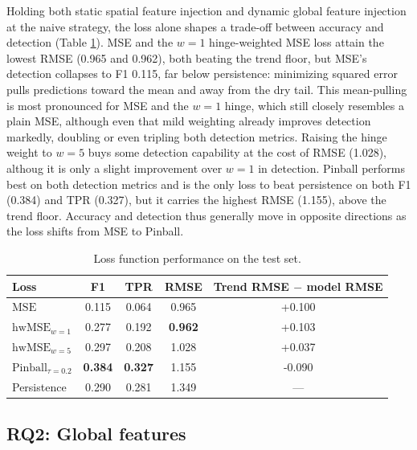 \documentclass[
]{krantz}
\begin{document}
Holding both static spatial feature injection and dynamic global feature injection at the naive strategy, the loss alone shapes a trade-off between accuracy and detection (Table \ref{tab:dp-loss-results}).
MSE and the \(w=1\) hinge-weighted MSE loss attain the lowest RMSE (0.965 and 0.962), both beating the trend floor, but MSE's detection collapses to F1 0.115, far below persistence: minimizing squared error pulls predictions toward the mean and away from the dry tail.
This mean-pulling is most pronounced for MSE and the \(w=1\) hinge, which still closely resembles a plain MSE, although even that mild weighting already improves detection markedly, doubling or even tripling both detection metrics.
Raising the hinge weight to \(w=5\) buys some detection capability at the cost of RMSE (1.028), althoug it is only a slight improvement over \(w=1\) in detection.
Pinball performs best on both detection metrics and is the only loss to beat persistence on both F1 (0.384) and TPR (0.327), but it carries the highest RMSE (1.155), above the trend floor.
Accuracy and detection thus generally move in opposite directions as the loss shifts from MSE to Pinball.

\begin{table}[!h]
\centering
\caption{\label{tab:dp-loss-results}Loss function performance on the test set.}
\centering
\fontsize{9}{11}\selectfont
\begin{tabular}[t]{lcccc}
\toprule
Loss & F1 & TPR & RMSE & Trend RMSE $-$ model RMSE\\
\midrule
\textcolor[HTML]{3C3C3C}{\textbf{$\mathrm{MSE}$}} & 0.115 & 0.064 & 0.965 & \textcolor[HTML]{005028}{+0.100}\\
\textcolor[HTML]{6EA5C8}{\textbf{$\mathrm{hwMSE}_{w=1}$}} & 0.277 & 0.192 & \textbf{0.962} & \textcolor[HTML]{005028}{+0.103}\\
\textcolor[HTML]{286EA0}{\textbf{$\mathrm{hwMSE}_{w=5}$}} & 0.297 & 0.208 & 1.028 & \textcolor[HTML]{005028}{+0.037}\\
\textcolor[HTML]{C6402A}{\textbf{$\mathrm{Pinball}_{\tau=0.2}$}} & \textbf{0.384} & \textbf{0.327} & 1.155 & \textcolor[HTML]{781414}{-0.090}\\
Persistence & 0.290 & 0.281 & 1.349 & ---\\
\bottomrule
\end{tabular}
\end{table}

\subsection{RQ2: Global features}\label{rq2-global-features}
\end{document}
